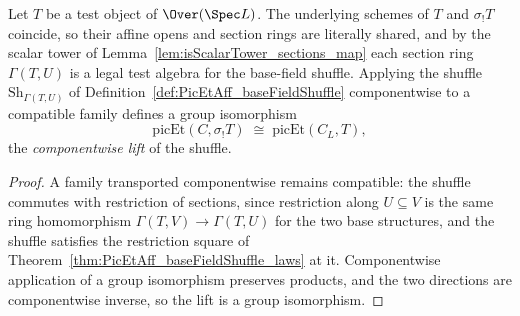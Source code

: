\begin{definition}
  \label{def:picEtCrossBase}
  \leanok
  Let \(T\) be a test object of \(\Over(\Spec L)\).  The underlying schemes of \(T\)
  and \(\sigma_{!}T\) coincide, so their affine opens and section rings are literally
  shared, and by the scalar tower of
  Lemma~\ref{lem:isScalarTower_sections_map} each section ring \(\Gamma(T, U)\) is a
  legal test algebra for the base-field shuffle.  Applying the shuffle
  \(\mathrm{Sh}_{\Gamma(T,U)}\) of Definition~\ref{def:PicEtAff_baseFieldShuffle}
  componentwise to a compatible family defines a group isomorphism
  \[
    \mathrm{picEt}(C, \sigma_{!}T) \;\cong\; \mathrm{picEt}(C_L, T),
  \]
  the \emph{componentwise lift} of the shuffle.
\end{definition}
\begin{proof}
  \leanok
  A family transported componentwise remains compatible: the shuffle commutes with
  restriction of sections, since restriction along \(U \subseteq V\) is the same ring
  homomorphism \(\Gamma(T, V) \to \Gamma(T, U)\) for the two base structures, and the
  shuffle satisfies the restriction square of
  Theorem~\ref{thm:PicEtAff_baseFieldShuffle_laws} at it.  Componentwise application
  of a group isomorphism preserves products, and the two directions are componentwise
  inverse, so the lift is a group isomorphism.
\end{proof}

